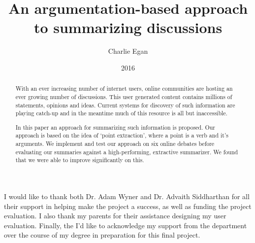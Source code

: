 \documentclass[BSc]{abdnthesis}
\title{An argumentation-based approach to summarizing discussions}
\author{Charlie Egan}
\date{2016}
\begin{document}

\maketitle
\makedeclaration


\begin{abstract}
  With an ever increasing number of internet users, online communities are hosting an ever growing number of discussions. This user generated content contains millions of statements, opinions and ideas. Current systems for discovery of such information are playing catch-up and in the meantime much of this resource is all but inaccessible.

  In this paper an approach for summarizing such information is proposed. Our approach is based on the idea of `point extraction', where a point is a verb and it's arguments. We implement and test our approach on six online debates before evaluating our summaries against a high-performing, extractive summarizer. We found that we were able to improve significantly on this.
\end{abstract}

\begin{acknowledgements}
  I would like to thank both Dr. Adam Wyner and Dr. Advaith Siddharthan for all their support in helping make the project a success, as well as funding the project evaluation. I also thank my parents for their assistance designing my user evaluation. Finally, the I'd like to acknowledge my support from the department over the course of my degree in preparation for this final project.
\end{acknowledgements}


\tableofcontents












\appendix




\end{document}
